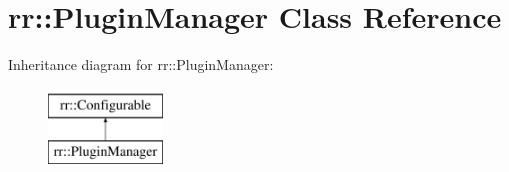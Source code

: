 \hypertarget{classrr_1_1_plugin_manager}{\section{rr\-:\-:Plugin\-Manager Class Reference}
\label{classrr_1_1_plugin_manager}
}
Inheritance diagram for rr\-:\-:Plugin\-Manager\-:\begin{figure}[H]
\begin{center}
\leavevmode
\includegraphics[height=2.000000cm]{classrr_1_1_plugin_manager}
\end{center}
\end{figure}
